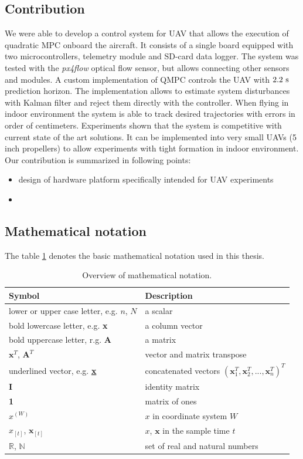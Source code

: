 \subsection{Contribution}

We were able to develop a control system for UAV that allows the execution of quadratic MPC onboard the aircraft. It consists of a single board equipped with two microcontrollers, telemetry module and SD-card data logger. The system was tested with the \textit{px4flow} optical flow sensor, but allows connecting other sensors and modules. A custom implementation of QMPC controls the UAV with $2.2~\mathrm{s}$ prediction horizon. The implementation allows to estimate system disturbances with Kalman filter and reject them directly with the controller. When flying in indoor environment the system is able to track desired trajectories with errors in order of centimeters. Experiments shown that the system is competitive with current state of the art solutions. It can be implemented into very small UAVs (5 inch propellers) to allow experiments with tight formation in indoor environment. Our contribution is summarized in following points:

\begin{itemize}
\item design of hardware platform specifically intended for UAV experiments
\item 
\end{itemize}

\subsection{Mathematical notation}

The table \ref{tab:notation} denotes the basic mathematical notation used in this thesis.

\begin{table}[h]
\centering
\begin{tabular}{ll}
\hline
Symbol & Description \\
\hline
lower or upper case letter, e.g. $n$, $N$ & a scalar \\
bold lowercase letter, e.g. \textbf{x} & a column vector \\ 
bold uppercase letter, r.g. \textbf{A} & a matrix \\
$\textbf{x}^T$, $\textbf{A}^T$ & vector and matrix transpose \\
underlined vector, e.g. \textbf{\underline{x}} & concatenated vectors $\left(\textbf{x}_1^T,\textbf{x}_2^T,...,\textbf{x}_n^T\right)^T$ \\
\textbf{I} & identity matrix \\
\textbf{1} & matrix of ones \\
$x^{(W)}$ & $x$ in coordinate system $W$ \\ 
$x_{[t]}$, $\textbf{x}_{[t]}$ & $x$, $\textbf{x}$ in the sample time $t$ \\
$\mathbb{R}$, $\mathbb{N}$ & set of real and natural numbers \\
\hline
\end{tabular}
\caption{Overview of mathematical notation.}
\label{tab:notation}
\end{table}


